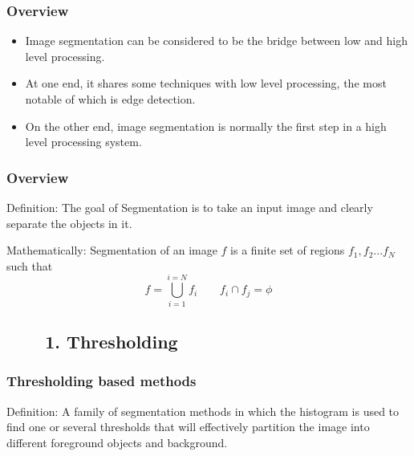 \begin{frame}
\frametitle{Overview}
\logoCSIPCPL\mypagenum
	\begin{itemize}
		\item Image segmentation can be considered to be the bridge between low and high level processing.
		\item At one end, it shares some techniques with low level processing, the most notable of which is edge detection.
		\item On the other end, image segmentation is normally the first step in a high level processing system.
	\end{itemize}
\end{frame}





\begin{frame}
\frametitle{Overview}
\logoCSIPCPL\mypagenum
	\begin{block}{Definition:}
		The goal of Segmentation is to take an input image and clearly separate the objects in it.
	\end{block}
	\begin{block}{Mathematically:}
		Segmentation of an image $f$ is a finite set of regions $f_1, f_2 ... f_N$ such that
		\begin{equation}
			f=\bigcup_{i=1}^{i=N} f_i \ \ \ \ \ \ \ \ \ f_i \cap f_j = \phi
		\end{equation}
	\end{block}
\end{frame}







\subsection{\ \ \ \ 1. Thresholding}
\begin{frame}
\frametitle{Thresholding based methods}
\logoCSIPCPL\mypagenum
	\begin{block}{Definition:}  
		A family of segmentation methods in which the histogram is used to find one or several thresholds that will effectively partition the image into different foreground objects and background.
	\end{block}
\end{frame}



